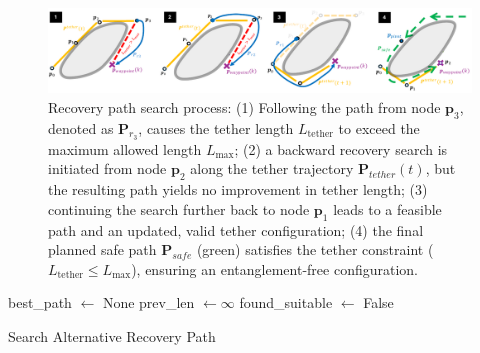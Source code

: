 \begin{figure}[t]
    \centering
    \includegraphics[width=\textwidth]{EA-Planner/figures/planner.pdf}
    \caption{Recovery path search process: 
    (1) Following the path from node \( \mathbf{p}_3 \), denoted as \( \mathbf{P}_{r_3} \), causes the tether length \( L_{\text{tether}} \) to exceed the maximum allowed length \( L_{\text{max}} \); 
    (2) a backward recovery search is initiated from node \( \mathbf{p}_2 \) along the tether trajectory \( \mathbf{P}_{tether}(t) \), but the resulting path yields no improvement in tether length; 
    (3) continuing the search further back to node \( \mathbf{p}_1 \) leads to a feasible path and an updated, valid tether configuration; 
    (4) the final planned safe path \( \mathbf{P}_{safe} \) (green) satisfies the tether constraint (\( L_{\text{tether}} \leq L_{\text{max}} \)), ensuring an entanglement-free configuration.}
    \label{fig:planner_search}
\end{figure}






\begin{algorithm}[H]
\BlankLine
best\_path $\gets$ None\;
prev\_len $\gets \infty$\;
found\_suitable $\gets$ False\;
\For{$i \gets |\mathbf{P}(t)| - 3$ \textbf{downto} 3}{
    $\mathbf{P}_{\text{candidate}} \gets \text{GenerateCandidatePath}(i, \mathbf{P}(t), \mathbf{p}_{\text{goal}})$\;
    $L_{\text{candidate}} \gets \text{ComputeLength}(i, \mathbf{P}(t), \mathbf{P}_{\text{candidate}})$\;
    \If{$L_{\text{candidate}} < 0.7L_{\max}$} %
    {
         best\_path $\gets \text{ExtractSegment}(i+2, \mathbf{P}(t))$\;
         found\_suitable $\gets$ True\;
         \textbf{break}\;
    }
    prev\_len $\gets \text{ComputeLength}(i-3, \mathbf{P}(t), \text{GeneratePath}(i-3, \mathbf{P}(t), \mathbf{p}_{\text{goal}}))$\;
}
\;
\caption{Search Alternative Recovery Path}
\label{alg:search_alternative}
\end{algorithm}

